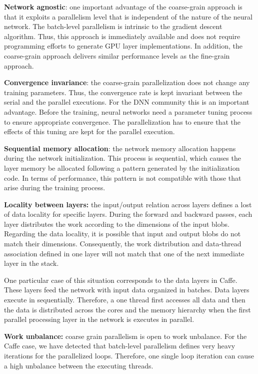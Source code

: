 \textbf{Network agnostic}: one important advantage of the coarse-grain 
approach is that it exploits a parallelism level that is independent of 
the nature of the neural network. The batch-level parallelism is 
intrinsic to the gradient descent algorithm. Thus, this approach is 
immediately available and does not require programming efforts to generate 
GPU layer implementations. In addition, the coarse-grain approach 
delivers similar performance levels as the fine-grain approach. 

\textbf{Convergence invariance}: the coarse-grain parallelization does not 
change any training parameters. Thus, the convergence rate is kept 
invariant between the serial and the parallel executions. 
For the DNN community this is an important advantage. Before 
the training, neural networks need a parameter tuning process to ensure 
appropriate convergence. The parallelization has to ensure that the effects of this tuning are kept for the parallel execution.

\textbf{Sequential memory allocation}: the network memory allocation
happens during the network initialization. This process is sequential, 
which causes the layer memory be allocated following a
pattern generated by the initialization code. In terms of performance, 
this pattern is not compatible with those that arise during
the training process.

\textbf{Locality between layers:} the input/output relation across layers
defines a lost of data locality for specific layers. During the forward 
and backward passes, each layer distributes the work according to the 
dimensions of the input blobs. Regarding the data locality, it is 
possible that input and output blobs do not match
their dimensions. Consequently, the work distribution and data-thread
association defined in one layer will not match that one of the
next immediate layer in the stack.

One particular case of this situation corresponds to the data
layers in Caffe. These layers feed the network with input data
organized in batches. Data layers execute in sequentially.
Therefore, a one thread first accesses all data and then the data is
distributed across the cores and the memory hierarchy when the
first parallel processing layer in the network is executes in parallel. 

\textbf{Work unbalance:} coarse grain parallelism is open to work unbalance. 
For the Caffe case, we have detected that batch-level parallelism 
defines very heavy iterations for the parallelized loops.
Therefore, one single loop iteration can cause a high unbalance
between the executing threads. 

